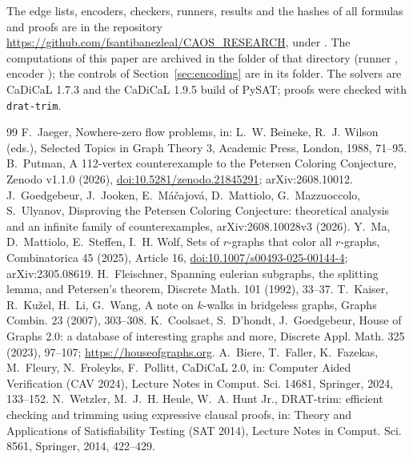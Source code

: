 \documentclass[11pt]{article}
\theoremstyle{definition}
\theoremstyle{remark}
\begin{document}
{\raggedright
The edge lists, encoders, checkers, runners, results and the hashes of all formulas and proofs
are in the repository \url{https://github.com/fsantibanezleal/CAOS_RESEARCH}, under
. The computations of this paper are archived in
the folder  of that directory (runner
, encoder ); the controls of
Section~\ref{sec:encoding} are in its  folder. The solvers are CaDiCaL
1.7.3 and the CaDiCaL 1.9.5 build of PySAT; proofs were checked with \texttt{drat-trim}.
\par}

\begin{thebibliography}{99}
 F.~Jaeger, Nowhere-zero flow problems, in: L.~W. Beineke, R.~J. Wilson
(eds.), Selected Topics in Graph Theory 3, Academic Press, London, 1988, 71--95.
 B.~Putman, A 112-vertex counterexample to the Petersen Coloring Conjecture,
Zenodo v1.1.0 (2026), \href{https://doi.org/10.5281/zenodo.21845291}{doi:10.5281/zenodo.21845291};
arXiv:2608.10012.
 J.~Goedgebeur, J.~Jooken, E.~M\'a\v{c}ajov\'a, D.~Mattiolo, G.~Mazzuoccolo,
S.~Ulyanov, Disproving the Petersen Coloring Conjecture: theoretical analysis and an infinite
family of counterexamples, arXiv:2608.10028v3 (2026).
 Y.~Ma, D.~Mattiolo, E.~Steffen, I.~H. Wolf, Sets of $r$-graphs that color all
$r$-graphs, Combinatorica 45 (2025), Article 16,
\href{https://doi.org/10.1007/s00493-025-00144-4}{doi:10.1007/s00493-025-00144-4}; arXiv:2305.08619.
 H.~Fleischner, Spanning eulerian subgraphs, the splitting lemma, and
Petersen's theorem, Discrete Math. 101 (1992), 33--37.
 T.~Kaiser, R.~Ku\v{z}el, H.~Li, G.~Wang, A note on $k$-walks in bridgeless
graphs, Graphs Combin. 23 (2007), 303--308.
 K.~Coolsaet, S.~D'hondt, J.~Goedgebeur, House of Graphs 2.0: a database of
interesting graphs and more, Discrete Appl. Math. 325 (2023), 97--107;
\url{https://houseofgraphs.org}.
 A.~Biere, T.~Faller, K.~Fazekas, M.~Fleury, N.~Froleyks, F.~Pollitt, CaDiCaL 2.0,
in: Computer Aided Verification (CAV 2024), Lecture Notes in Comput. Sci. 14681, Springer, 2024,
133--152.
 N.~Wetzler, M.~J.~H. Heule, W.~A. Hunt Jr., DRAT-trim: efficient checking and
trimming using expressive clausal proofs, in: Theory and Applications of Satisfiability Testing
(SAT 2014), Lecture Notes in Comput. Sci. 8561, Springer, 2014, 422--429.
\end{thebibliography}
\end{document}
